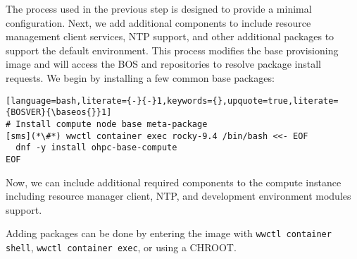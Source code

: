 The process used in the previous step is designed to
provide a minimal \baseOS{} configuration. Next, we add additional components
to include resource management client services, NTP support, and
other additional packages to support the default \OHPC{} environment. This
process modifies the base provisioning image and will access the BOS and \OHPC{}
repositories to resolve package install requests. We begin by installing a few
common base packages:

\begin{lstlisting}[language=bash,literate={-}{-}1,keywords={},upquote=true,literate={BOSVER}{\baseos{}}1]
# Install compute node base meta-package
[sms](*\#*) wwctl container exec rocky-9.4 /bin/bash <<- EOF
  dnf -y install ohpc-base-compute
EOF
\end{lstlisting}

\noindent Now, we can include additional required components to the compute
instance including resource manager client, NTP, and development environment modules support.

Adding packages can be done by entering the image with \texttt{wwctl container shell},
\texttt{wwctl container exec}, or using a CHROOT.

